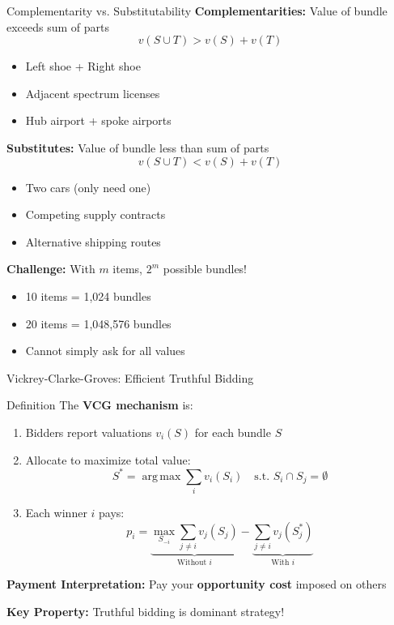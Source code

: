 \documentclass[xcolor={x11names}, aspectratio=169 ]{beamer}
\DeclareMathOperator*{\argmax}{arg\,max}
\begin{document}
\begin{frame}{Complementarity vs. Substitutability}
\textbf{Complementarities:} Value of bundle exceeds sum of parts
$$v(S \cup T) > v(S) + v(T)$$

\begin{itemize}
  \item Left shoe + Right shoe
  \item Adjacent spectrum licenses
  \item Hub airport + spoke airports
\end{itemize}

\textbf{Substitutes:} Value of bundle less than sum of parts
$$v(S \cup T) < v(S) + v(T)$$

\begin{itemize}
  \item Two cars (only need one)
  \item Competing supply contracts
  \item Alternative shipping routes
\end{itemize}

\textbf{Challenge:} With $m$ items, $2^m$ possible bundles!
\begin{itemize}
  \item 10 items = 1,024 bundles
  \item 20 items = 1,048,576 bundles
  \item Cannot simply ask for all values
\end{itemize}
\end{frame}

\begin{frame}{Vickrey-Clarke-Groves: Efficient Truthful Bidding}
\begin{block}{Definition}
The \textbf{VCG mechanism} is:
\begin{enumerate}
  \item Bidders report valuations $v_i(S)$ for each bundle $S$
  \item Allocate to maximize total value:
  $$S^* = \argmax \sum_{i} v_i(S_i) \quad \text{s.t. } S_i \cap S_j = \emptyset$$
  \item Each winner $i$ pays:
  $$p_i = \underbrace{\max_{S_{-i}} \sum_{j \neq i} v_j(S_j)}_{\text{Without } i} - \underbrace{\sum_{j \neq i} v_j(S_j^*)}_{\text{With } i}$$
\end{enumerate}
\end{block}

\textbf{Payment Interpretation:} Pay your \textbf{opportunity cost} imposed on others

\textbf{Key Property:} Truthful bidding is dominant strategy!
\end{frame}
\end{document}
